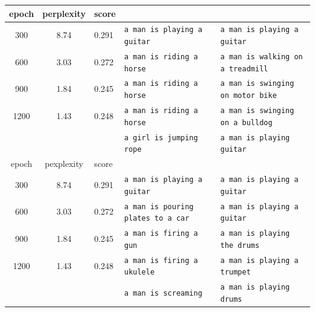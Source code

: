 \documentclass[12pt, a4paper]{article}
\theoremstyle{mystyle}	%
\begin{document}
\begin{tabular}{|c|c|l|l|l|}
  \hline
  epoch & perplexity & score & &  \\
  \hline
  300 & 8.74 & 0.291 & \texttt{a man is playing a guitar} &
        \texttt{a man is playing a guitar} \\
  \hline
  600 & 3.03 & 0.272 & \texttt{a man is riding a horse} &
        \texttt{a man is walking on a treadmill} \\
  \hline
  900 & 1.84 & 0.245 & \texttt{a man is riding a horse} &
        \texttt{a man is swinging on motor bike} \\
  \hline
  1200 & 1.43 & 0.248 & \texttt{a man is riding a horse} &
         \texttt{a man is swinging on a bulldog} \\
  \hline
       &      &       & \texttt{a girl is jumping rope} &
         \texttt{a man is playing guitar} \\
  \hline
  epoch & pexplexity & score & &  \\
  \hline
  300 & 8.74 & 0.291 & \texttt{a man is playing a guitar} &
        \texttt{a man is playing a guitar} \\
  \hline
  600 & 3.03 & 0.272 & \texttt{a man is pouring plates to a car} &
        \texttt{a man is playing a guitar} \\
  \hline
  900 & 1.84 & 0.245 & \texttt{a man is firing a gun} &
        \texttt{a man is playing the drums} \\
  \hline
  1200 & 1.43 & 0.248 & \texttt{a man is firing a ukulele} &
         \texttt{a man is playing a trumpet} \\
  \hline
       &      &       & \texttt{a man is screaming} &
         \texttt{a man is playing drums} \\
  \hline
\end{tabular}
\end{document}
